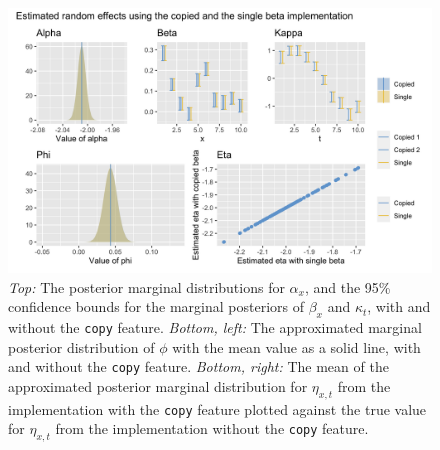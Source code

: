 \begin{figure}[h!]
    \centering
    \includegraphics[width=0.85\linewidth]{synthetic-data/Figures/copy-beta.png}
    \caption{\textit{Top:} The posterior marginal distributions for $\alpha_x$, and the 95\% confidence bounds for the marginal posteriors of $\beta_x$ and $\kappa_t$, with and without the \texttt{copy} feature. \textit{Bottom, left:} The approximated marginal posterior distribution of $\phi$ with the mean value as a solid line, with and without the \texttt{copy} feature. \textit{Bottom, right:} The mean of the approximated posterior marginal distribution for $\eta_{x,t}$ from the implementation with the \texttt{copy} feature plotted against the true value for $\eta_{x,t}$ from the implementation without the \texttt{copy} feature. }
    \label{fig:copyBetaComparison}
\end{figure}

